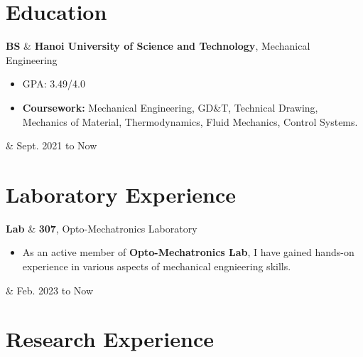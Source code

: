 \documentclass[10pt, letterpaper]{article}
\newenvironment{highlights}{
        \begin{itemize}[
                topsep=0pt,
                parsep=0.10 cm,
                partopsep=0pt,
                itemsep=0pt,
                after=\vspace{-1\baselineskip},
                leftmargin=0.4 cm + 3pt
            ]
    }{
        \end{itemize}
    } %
\let\originalTabularx\tabularx
\let\originalEndTabularx\endtabularx
\renewenvironment{tabularx}{\bgroup\centering\originalTabularx}{\originalEndTabularx\par\egroup}
\begin{document}
    
    \section{Education}

        \begin{tabularx}{
            \textwidth-0.4 cm-0.13cm
        }{
            L{0.85cm}
            K{0.2 cm}
            R{4.1 cm}
        }
            \textbf{BS}
            &
            \textbf{Hanoi University of Science and Technology}, Mechanical Engineering

            \vspace{0.10 cm}

            \begin{highlights}
                \item GPA: 3.49/4.0
                \item \textbf{Coursework:} Mechanical Engineering, GD\&T, Technical Drawing, Mechanics of Material, Thermodynamics, Fluid Mechanics, Control Systems.
            \end{highlights}
            &
            Sept. 2021 to Now
        \end{tabularx}

    \section{Laboratory Experience}
        \begin{tabularx}{
            \textwidth-0.4 cm-0.13cm
        }{
            L{0.85cm}
            K{0.2 cm}
            R{4.1 cm}
        }
            \textbf{Lab}
            &
            \textbf{307}, Opto-Mechatronics Laboratory

            \vspace{0.10 cm}

            \begin{highlights}
                \item As an active member of \textbf{Opto-Mechatronics Lab}, I have gained hands-on experience in various aspects of mechanical engnieering skills.
            \end{highlights}
            &
            Feb. 2023 to Now
        \end{tabularx}

    \section{Research Experience}
\end{document}
